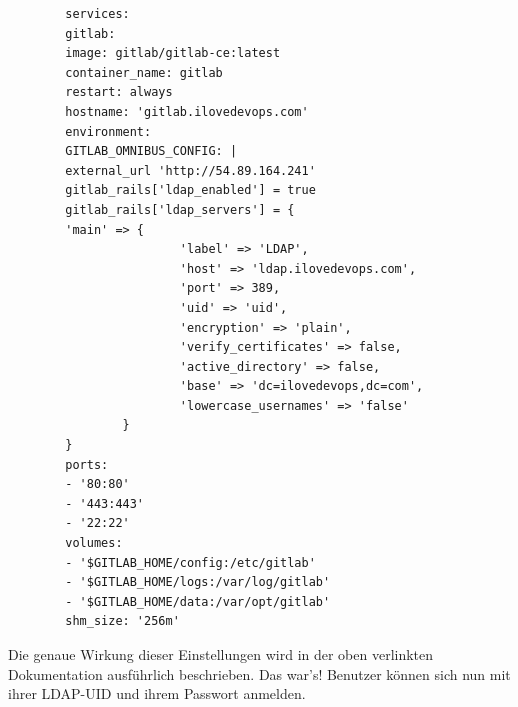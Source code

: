 \documentclass[a4paper,12pt]{article}
\begin{document}
\begin{verbatim}
		services:
		gitlab:
		image: gitlab/gitlab-ce:latest
		container_name: gitlab
		restart: always
		hostname: 'gitlab.ilovedevops.com'
		environment:
		GITLAB_OMNIBUS_CONFIG: |
		external_url 'http://54.89.164.241'
		gitlab_rails['ldap_enabled'] = true
		gitlab_rails['ldap_servers'] = {
		'main' => {
						'label' => 'LDAP',
						'host' => 'ldap.ilovedevops.com',
						'port' => 389,
						'uid' => 'uid',
						'encryption' => 'plain',
						'verify_certificates' => false,
						'active_directory' => false,
						'base' => 'dc=ilovedevops,dc=com',
						'lowercase_usernames' => 'false'
				}
		}
		ports:
		- '80:80'
		- '443:443'
		- '22:22'
		volumes:
		- '$GITLAB_HOME/config:/etc/gitlab'
		- '$GITLAB_HOME/logs:/var/log/gitlab'
		- '$GITLAB_HOME/data:/var/opt/gitlab'
		shm_size: '256m'
\end{verbatim}

Die genaue Wirkung dieser Einstellungen wird in der oben verlinkten Dokumentation ausführlich beschrieben.
Das war’s! Benutzer können sich nun mit ihrer LDAP-UID und ihrem Passwort anmelden.




\newpage
{}
\listoffigures
\newpage
{}
\listoftables
\end{document}
